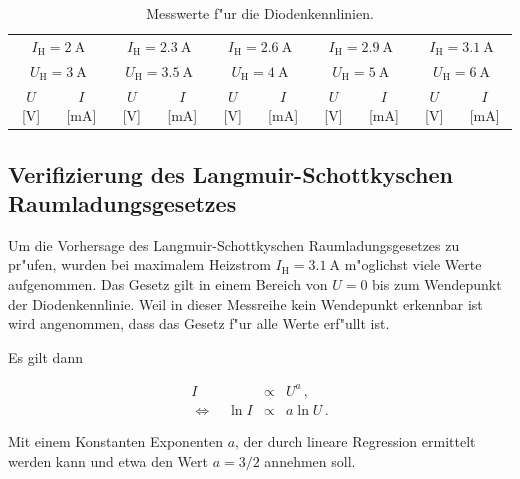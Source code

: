 		\begin{table}[h!]
			\begin{center}
				\label{messung1}
				\caption{Messwerte f"ur die Diodenkennlinien.}
				\begin{tabular}{|c|c||c|c||c|c||c|c||c|c|}
					\hline
						\multicolumn{2}{|c||}{$I_\mathrm{H} = \SI{2}{\ampere}$} &
						\multicolumn{2}{c||}{$I_\mathrm{H} = \SI{2.3}{\ampere}$} &
						\multicolumn{2}{c||}{$I_\mathrm{H} = \SI{2.6}{\ampere}$} &
						\multicolumn{2}{c||}{$I_\mathrm{H} = \SI{2.9}{\ampere}$} &
						\multicolumn{2}{c|}{$I_\mathrm{H} = \SI{3.1}{\ampere}$} \\
						\multicolumn{2}{|c||}{$U_\mathrm{H} = \SI{3}{\ampere}$} &
						\multicolumn{2}{c||}{$U_\mathrm{H} = \SI{3.5}{\ampere}$} &
						\multicolumn{2}{c||}{$U_\mathrm{H} = \SI{4}{\ampere}$} &
						\multicolumn{2}{c||}{$U_\mathrm{H} = \SI{5}{\ampere}$} &
						\multicolumn{2}{c|}{$U_\mathrm{H} = \SI{6}{\ampere}$} \\
					\hline 
						$U$ [V] & $I$ [mA] & $U$ [V] & $I$ [mA] & $U$ [V] & $I$ [mA] & $U$ [V] & $I$ [mA] & $U$ [V] & $I$ [mA] \\
					\hline 
					\hline
						
					\hline 
				\end{tabular}
			\end{center}
		\end{table}

		\clearpage

	\subsection{Verifizierung des Langmuir-Schottkyschen Raumladungsgesetzes}
		\label{subsec:langmuir}
		Um die Vorhersage des Langmuir-Schottkyschen Raumladungsgesetzes zu pr"ufen, wurden bei maximalem Heizstrom $I_\mathrm{H} = \SI{3.1}{\ampere}$ m"oglichst viele Werte aufgenommen.
		Das Gesetz gilt in einem Bereich von $U = 0$ bis zum Wendepunkt der Diodenkennlinie.
		Weil in dieser Messreihe kein Wendepunkt erkennbar ist wird angenommen, dass das Gesetz f"ur alle Werte erf"ullt ist.

		Es gilt dann

		\begin{eqnarray*}
			I & \propto & U^a\,, \\
			\Leftrightarrow \quad \ln{I} & \propto & a \ln{U}\,.
		\end{eqnarray*}

		Mit einem Konstanten Exponenten $a$, der durch lineare Regression ermittelt werden kann und etwa den Wert $a = 3/2$ annehmen soll.


